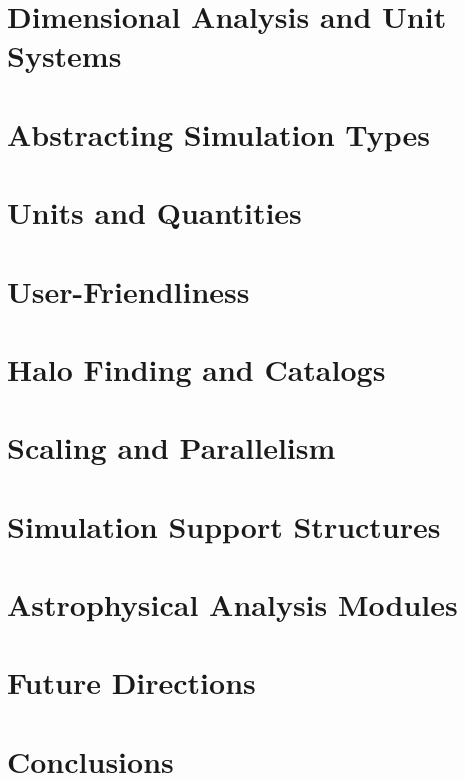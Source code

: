 \documentclass{emulateapj}
\begin{document}
\section{Dimensional Analysis and Unit Systems}


\section{Abstracting Simulation Types}


\section{Units and Quantities}


\section{User-Friendliness}


\section{Halo Finding and Catalogs}


\section{Scaling and Parallelism}


\section{Simulation Support Structures}


\section{Astrophysical Analysis Modules}


\section{Future Directions}


\section{Conclusions}\label{sec:conclusions}


\acknowledgments 



\end{document}
